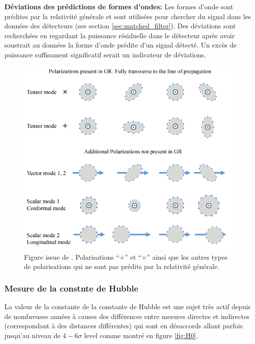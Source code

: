 \vspace{0.2cm}
\textbf{Déviations des prédictions de formes d'ondes:} Les formes d'onde sont prédites par la relativité générale et sont utilisées pour chercher du signal dans les données des détecteurs (see section \ref{sec:matched_filter}).
Des déviations sont recherchées en regardant la puissance résiduelle dans le détecteur après avoir soustrait au données la forme d'onde prédite d'un signal détecté.
Un excès de puissance suffisament significatif serait un indicateur de déviations.
%
\begin{figure}
  \centering
  \includegraphics[width=0.6\linewidth]{sectionGW/other_polarization.png}
  \caption{Figure issue de \cite{other_polarization}. Polarisations ``$+$'' et ``$\times$'' ainsi que les autres types de polarisations qui ne sont pas prédits par la relativité générale.}
  \label{fig:other_polarization}
\end{figure}
%


\subsubsection*{Mesure de la constnte de Hubble}
\label{sec:H0}
La valeur de la constante de la constante de Hubble est une sujet très actif depuis de nombreuses années à causes des différences entre mesures directes et indirectes (correspondant à des distances différentes) qui sont en désaccords allant parfois jusqu'au niveau de $4-6\sigma$ level \cite{H0_1} comme montré en figure \ref{fig:H0}.

